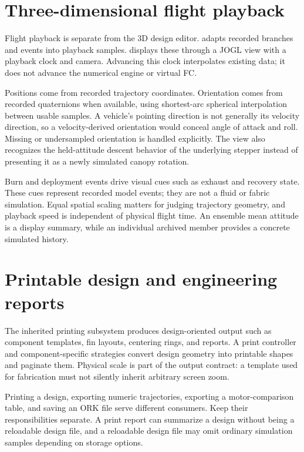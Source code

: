 \section{Three-dimensional flight playback}
Flight playback is separate from the 3D design editor.  adapts recorded branches and events into playback samples.  displays these through a JOGL view with a playback clock and camera. Advancing this clock interpolates existing data; it does not advance the numerical engine or virtual FC.

Positions come from recorded trajectory coordinates. Orientation comes from recorded quaternions when available, using shortest-arc spherical interpolation between usable samples. A vehicle's pointing direction is not generally its velocity direction, so a velocity-derived orientation would conceal angle of attack and roll. Missing or undersampled orientation is handled explicitly. The view also recognizes the held-attitude descent behavior of the underlying stepper instead of presenting it as a newly simulated canopy rotation.

Burn and deployment events drive visual cues such as exhaust and recovery state. These cues represent recorded model events; they are not a fluid or fabric simulation. Equal spatial scaling matters for judging trajectory geometry, and playback speed is independent of physical flight time. An ensemble mean attitude is a display summary, while an individual archived member provides a concrete simulated history.


\section{Printable design and engineering reports}
The inherited printing subsystem produces design-oriented output such as component templates, fin layouts, centering rings, and reports. A print controller and component-specific strategies convert design geometry into printable shapes and paginate them. Physical scale is part of the output contract: a template used for fabrication must not silently inherit arbitrary screen zoom.

Printing a design, exporting numeric trajectories, exporting a motor-comparison table, and saving an ORK file serve different consumers. Keep their responsibilities separate. A print report can summarize a design without being a reloadable design file, and a reloadable design file may omit ordinary simulation samples depending on storage options.


